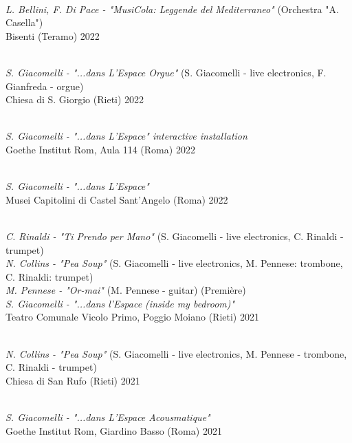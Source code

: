     {\\\textit{L. Bellini, F. Di Pace - "MusiCola: Leggende del Mediterraneo"} (Orchestra "A. Casella")\\
    Bisenti (Teramo)}
    {2022}

    {\\\textit{S. Giacomelli - "...dans L'Espace Orgue"} (S. Giacomelli - live electronics, F. Gianfreda - orgue)\\
    Chiesa di S. Giorgio (Rieti)}
    {2022}

    {\\\textit{S. Giacomelli - "...dans L'Espace" interactive installation}\\
    Goethe Institut Rom, Aula 114 (Roma)}
    {2022}

    {\\\textit{S. Giacomelli - "...dans L'Espace"}\\
    Musei Capitolini di Castel Sant'Angelo (Roma)}
    {2022}

    {\\\textit{C. Rinaldi - "Ti Prendo per Mano"} (S. Giacomelli - live electronics, C. Rinaldi - trumpet)\\
    \textit{N. Collins - "Pea Soup"} (S. Giacomelli - live electronics, M. Pennese: trombone, C. Rinaldi: trumpet)\\
    \textit{M. Pennese - "Or-mai"} (M. Pennese - guitar) (Première)\\
    \textit{S. Giacomelli - "...dans l’Espace (inside my bedroom)"}\\
    Teatro Comunale Vicolo Primo, Poggio Moiano (Rieti)}
    {2021}

    {\\\textit{N. Collins - "Pea Soup"} (S. Giacomelli - live electronics, M. Pennese - trombone, C. Rinaldi - trumpet)\\ 
    Chiesa di San Rufo (Rieti)}
    {2021}

    {\\\textit{S. Giacomelli - "...dans L'Espace Acousmatique"}\\ 
    Goethe Institut Rom, Giardino Basso (Roma)}
    {2021}

